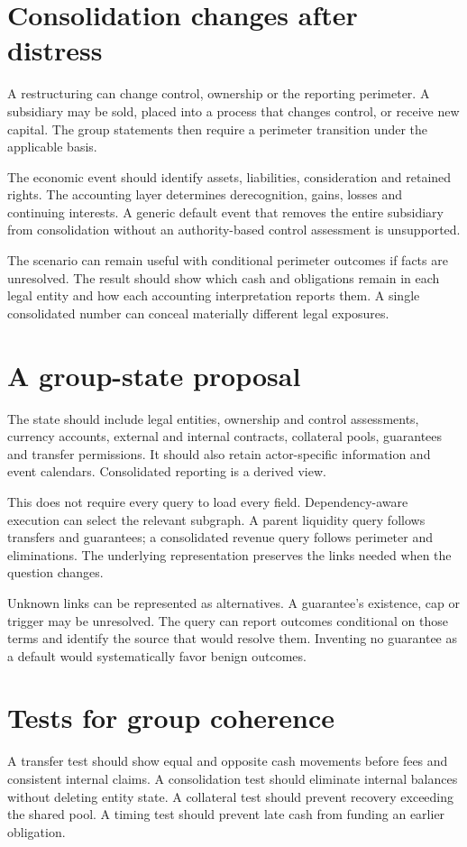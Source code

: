 \section{Consolidation changes after distress}
A restructuring can change control, ownership or the reporting perimeter. A subsidiary may be sold, placed into a process that changes control, or receive new capital. The group statements then require a perimeter transition under the applicable basis.

The economic event should identify assets, liabilities, consideration and retained rights. The accounting layer determines derecognition, gains, losses and continuing interests. A generic default event that removes the entire subsidiary from consolidation without an authority-based control assessment is unsupported.

The scenario can remain useful with conditional perimeter outcomes if facts are unresolved. The result should show which cash and obligations remain in each legal entity and how each accounting interpretation reports them. A single consolidated number can conceal materially different legal exposures.

\section{A group-state proposal}
The state should include legal entities, ownership and control assessments, currency accounts, external and internal contracts, collateral pools, guarantees and transfer permissions. It should also retain actor-specific information and event calendars. Consolidated reporting is a derived view.

This does not require every query to load every field. Dependency-aware execution can select the relevant subgraph. A parent liquidity query follows transfers and guarantees; a consolidated revenue query follows perimeter and eliminations. The underlying representation preserves the links needed when the question changes.

Unknown links can be represented as alternatives. A guarantee's existence, cap or trigger may be unresolved. The query can report outcomes conditional on those terms and identify the source that would resolve them. Inventing no guarantee as a default would systematically favor benign outcomes.

\section{Tests for group coherence}
A transfer test should show equal and opposite cash movements before fees and consistent internal claims. A consolidation test should eliminate internal balances without deleting entity state. A collateral test should prevent recovery exceeding the shared pool. A timing test should prevent late cash from funding an earlier obligation.

